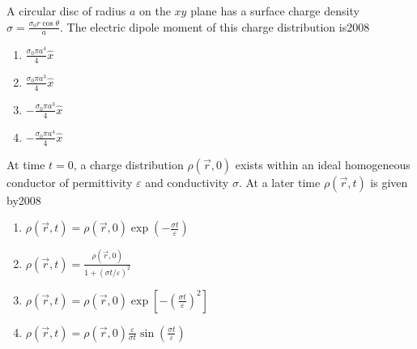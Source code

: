 \iffalse
\chapter{2008}
\author{Prajwal naik}
\section{ph}
\fi













    \item A circular disc of radius $a$ on the $x y$ plane has a surface charge density $\sigma=\frac{\sigma_{0} r \cos \theta}{a}$. The electric dipole moment of this charge distribution is\hfill{2008}
    \begin{multicols}{4}
			\begin{enumerate}
\item $\frac{\sigma_{0} \pi a^{4}}{4} \hat{x}$
\item $\frac{\sigma_{0} \pi a^{3}}{4} \hat{x}$
\item $-\frac{\sigma_{0} \pi a^{3}}{4} \hat{x}$
\item $-\frac{\sigma_{0} \pi a^{4}}{4} \hat{x}$
        \end{enumerate}
		\end{multicols}

    \item At time $t=0$, a charge distribution $\rho(\vec{r}, 0)$ exists within an ideal homogeneous conductor of permittivity $\varepsilon$ and conductivity $\sigma$. At a later time $\rho(\vec{r}, t)$ is given by\hfill{2008}


		\begin{multicols}{1}
			\begin{enumerate}
	\item  $\rho(\vec{r}, t)=\rho(\vec{r}, 0) \exp \left(-\frac{\sigma t}{\varepsilon}\right)$
\item $\rho(\vec{r}, t)=\frac{\rho(\vec{r}, 0)}{1+(\sigma t / \varepsilon)^{2}}$
\item $\rho(\vec{r}, t)=\rho(\vec{r}, 0) \exp \left[-\left(\frac{\sigma t}{\varepsilon}\right)^{2}\right]$
\item $\rho(\vec{r}, t)=\rho(\vec{r}, 0) \frac{\varepsilon}{\sigma t} \sin \left(\frac{\sigma t}{\varepsilon}\right)$
			\end{enumerate}
		\end{multicols}

